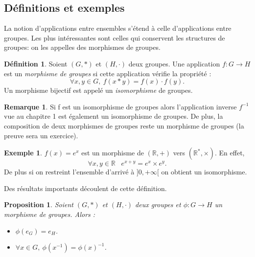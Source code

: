 \documentclass[oneside,12pt,french,table]{book}
\newtheorem{prop}{Proposition}[section]
\theoremstyle{definition}
\theoremstyle{definition}
\newtheorem*{example}{Exemple}
\theoremstyle{definition}
\newtheorem{definition}{Définition}[chapter]
\newtheorem*{remark}{Remarque}
\begin{document}
\subsection{Définitions et exemples}
La notion d'applications entre ensembles s'étend à celle d'applications entre groupes. Les plus intéressantes sont celles qui conservent les structures de groupes: on les appelles des morphismes de groupes. 
\begin{definition}
Soient $(G,*)$ et $(H, \cdot)$ deux groupes. Une application $f : G \longrightarrow H$ est un \textit{morphisme de groupes} si cette application vérifie la propriété :
\[\forall x,y \in G, \ f(x * y) = f(x) \cdot f(y).\]
Un morphisme bijectif est appelé un \textit{isomorphisme} de groupes.
\end{definition}
\begin{remark}
Si f est un isomorphisme de groupes alors l'application inverse $f^{-1}$ vue au chapitre 1 est également un isomorphisme de groupes. De plus, la composition de deux morphismes de groupes reste un morphisme de groupes (la preuve sera un exercice).
\end{remark}
\begin{example}
 $f(x)=e^x$ est un morphisme de $(\mathbb{R}, +)$ vers $(\mathbb{R}^*, \times)$. En effet,
 $$\forall x,y \in \mathbb{R} \;\;\; e^{x+y}=e^x\times
 e^y.$$
 De plus si on restreint l'ensemble d'arrivé à $]0,+\infty[$ on obtient un isomorphisme.
\end{example}
\noindent
Des résultats importants découlent de cette définition.
\begin{prop}
Soient $(G,*)$ et $(H, \cdot)$ deux groupes et $\phi : G \longrightarrow H$ un morphisme de groupes. Alors : 
\begin{itemize}
    \item $\phi(e_G) = e_H$.
    \item $\forall x \in G, \ \phi(x^{-1}) = \phi(x)^{-1}$.
\end{itemize}
\end{prop}
\end{document}
